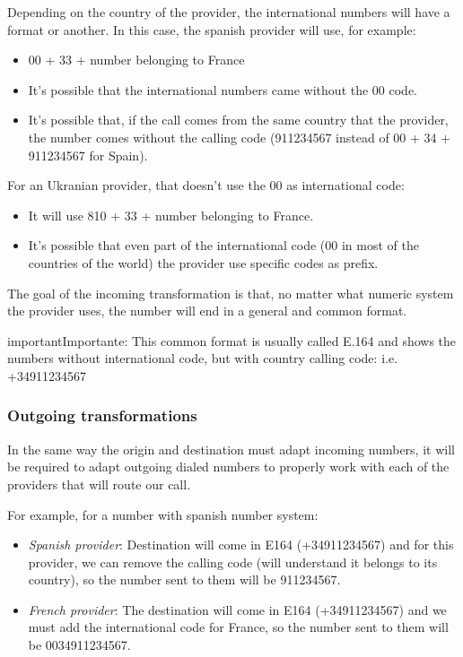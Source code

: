 \documentclass[letterpaper,10pt,spanish]{sphinxmanual}
\begin{document}
Depending on the country of the provider, the international numbers will have
a format or another. In this case, the spanish provider will use, for example:
\begin{itemize}
\item {} 
00 + 33 + number belonging to France

\item {} 
It's possible that the international numbers came without the 00 code.

\item {} 
It's possible that, if the call comes from the same country that the provider,
the number comes without the calling code (911234567 instead of 00 + 34 +
911234567 for Spain).

\end{itemize}

For an Ukranian provider, that doesn't use the 00 as international code:
\begin{itemize}
\item {} 
It will use 810 + 33 + number belonging to France.

\item {} 
It's possible that even part of the international code (00 in most of the
countries of the world) the provider use specific codes as prefix.

\end{itemize}

The goal of the incoming transformation is that, no matter what numeric system
the provider uses, the number will end in a general and common format.
\label{administration_portal/brand/settings/numeric_transformations:e164}
\begin{notice}{important}{Importante:}
This common format is usually called E.164 and shows the numbers
without international code, but with country calling code: i.e. +34911234567
\end{notice}


\subsubsection{Outgoing transformations}
\label{administration_portal/brand/settings/numeric_transformations:outgoing-transformations}
In the same way the origin and destination must adapt incoming numbers, it
will be required to adapt outgoing dialed numbers to properly work with each
of the providers that will route our call.

For example, for a number with spanish number system:
\begin{itemize}
\item {} 
\emph{Spanish provider}: Destination will come in E164 (+34911234567) and for this
provider, we can remove the calling code (will understand it belongs to
its country), so the number sent to them will be 911234567.

\item {} 
\emph{French provider}: The destination will come in E164 (+34911234567) and we must
add the international code for France, so the number sent to them will be
0034911234567.

\end{itemize}
\end{document}
